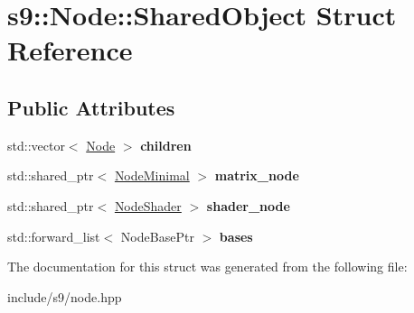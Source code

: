 \hypertarget{structs9_1_1Node_1_1SharedObject}{\section{s9\-:\-:Node\-:\-:Shared\-Object Struct Reference}
\label{structs9_1_1Node_1_1SharedObject}
}
\subsection*{Public Attributes}
\begin{DoxyCompactItemize}
\item 
\hypertarget{structs9_1_1Node_1_1SharedObject_aeb48ba7dce6176845771e2a5a53c3569}{std\-::vector$<$ \hyperlink{classs9_1_1Node}{Node} $>$ {\bfseries children}}\label{structs9_1_1Node_1_1SharedObject_aeb48ba7dce6176845771e2a5a53c3569}

\item 
\hypertarget{structs9_1_1Node_1_1SharedObject_addd0c4fc2a29fcb2f77780156a8c6c6c}{std\-::shared\-\_\-ptr$<$ \hyperlink{classs9_1_1NodeMinimal}{Node\-Minimal} $>$ {\bfseries matrix\-\_\-node}}\label{structs9_1_1Node_1_1SharedObject_addd0c4fc2a29fcb2f77780156a8c6c6c}

\item 
\hypertarget{structs9_1_1Node_1_1SharedObject_a9f68cf4413fb81b4b0f06229d383ee19}{std\-::shared\-\_\-ptr$<$ \hyperlink{classs9_1_1NodeShader}{Node\-Shader} $>$ {\bfseries shader\-\_\-node}}\label{structs9_1_1Node_1_1SharedObject_a9f68cf4413fb81b4b0f06229d383ee19}

\item 
\hypertarget{structs9_1_1Node_1_1SharedObject_ae0732b99444cd07bc05ab238ff5e22dd}{std\-::forward\-\_\-list$<$ Node\-Base\-Ptr $>$ {\bfseries bases}}\label{structs9_1_1Node_1_1SharedObject_ae0732b99444cd07bc05ab238ff5e22dd}

\end{DoxyCompactItemize}


The documentation for this struct was generated from the following file\-:\begin{DoxyCompactItemize}
\item 
include/s9/node.\-hpp\end{DoxyCompactItemize}
